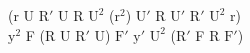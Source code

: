 (r U $\text{R}'$ U R $\text{U}^2$ ($\text{r}^2$) $\text{U}'$ R $\text{U}'$ $\text{R}'$ $\text{U}^2$ r)\\
$\text{y}^2$ F (R U $\text{R}'$ U) $\text{F}'$ $\text{y}'$ $\text{U}^2$ ($\text{R}'$ F R $\text{F}'$)\\
